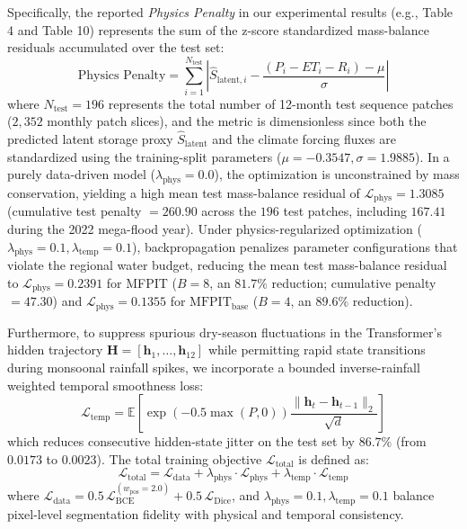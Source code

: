 \documentclass[preprint,12pt]{elsarticle}
\begin{document}
Specifically, the reported \textit{Physics Penalty} in our experimental results (e.g., Table 4 and Table 10) represents the sum of the z-score standardized mass-balance residuals accumulated over the test set:
\begin{equation}
\text{Physics Penalty} = \sum_{i=1}^{N_{\text{test}}} \left|\hat{S}_{\text{latent}, i} - \frac{(P_i - ET_i - R_i) - \mu}{\sigma}\right|
\end{equation}
where $N_{\text{test}} = 196$ represents the total number of 12-month test sequence patches ($2,352$ monthly patch slices), and the metric is dimensionless since both the predicted latent storage proxy $\hat{S}_{\text{latent}}$ and the climate forcing fluxes are standardized using the training-split parameters ($\mu = -0.3547, \sigma = 1.9885$). In a purely data-driven model ($\lambda_{\text{phys}} = 0.0$), the optimization is unconstrained by mass conservation, yielding a high mean test mass-balance residual of $\mathcal{L}_{\text{phys}} = 1.3085$ (cumulative test penalty $= 260.90$ across the $196$ test patches, including $167.41$ during the 2022 mega-flood year). Under physics-regularized optimization ($\lambda_{\text{phys}} = 0.1, \lambda_{\text{temp}} = 0.1$), backpropagation penalizes parameter configurations that violate the regional water budget, reducing the mean test mass-balance residual to $\mathcal{L}_{\text{phys}} = 0.2391$ for MFPIT ($B=8$, an $81.7\%$ reduction; cumulative penalty $= 47.30$) and $\mathcal{L}_{\text{phys}} = 0.1355$ for $\text{MFPIT}_{\text{base}}$ ($B=4$, an $89.6\%$ reduction).

Furthermore, to suppress spurious dry-season fluctuations in the Transformer's hidden trajectory $\mathbf{H} = [\mathbf{h}_1, \dots, \mathbf{h}_{12}]$ while permitting rapid state transitions during monsoonal rainfall spikes, we incorporate a bounded inverse-rainfall weighted temporal smoothness loss:
\begin{equation}
\mathcal{L}_{\text{temp}} = \mathbb{E}\left[ \exp\!\left(-0.5 \max(P, 0)\right) \frac{\|\mathbf{h}_t - \mathbf{h}_{t-1}\|_2}{\sqrt{d}} \right]
\end{equation}
which reduces consecutive hidden-state jitter on the test set by $86.7\%$ (from $0.0173$ to $0.0023$). The total training objective $\mathcal{L}_{\text{total}}$ is defined as:
\begin{equation}
\mathcal{L}_{\text{total}} = \mathcal{L}_{\text{data}} + \lambda_{\text{phys}} \cdot \mathcal{L}_{\text{phys}} + \lambda_{\text{temp}} \cdot \mathcal{L}_{\text{temp}}
\end{equation}
where $\mathcal{L}_{\text{data}} = 0.5\,\mathcal{L}_{\text{BCE}}^{(w_{\text{pos}}=2.0)} + 0.5\,\mathcal{L}_{\text{Dice}}$, and $\lambda_{\text{phys}} = 0.1, \lambda_{\text{temp}} = 0.1$ balance pixel-level segmentation fidelity with physical and temporal consistency.
\end{document}
